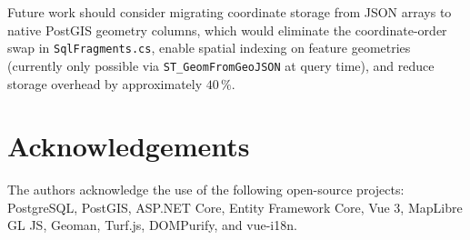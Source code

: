 \documentclass[12pt,a4paper]{article}
\theoremstyle{definition}
\theoremstyle{plain}
\theoremstyle{remark}
\begin{document}
Future work should consider migrating coordinate storage from JSON arrays
to native PostGIS geometry columns, which would eliminate the
coordinate-order swap in \texttt{SqlFragments.cs}, enable spatial
indexing on feature geometries (currently only possible via
\texttt{ST\_GeomFromGeoJSON} at query time), and reduce storage overhead
by approximately $40\,\%$.

\section*{Acknowledgements}

The authors acknowledge the use of the following open-source projects:
PostgreSQL, PostGIS, ASP.NET Core, Entity Framework Core, Vue 3, MapLibre
GL JS, Geoman, Turf.js, DOMPurify, and vue-i18n.
\end{document}
